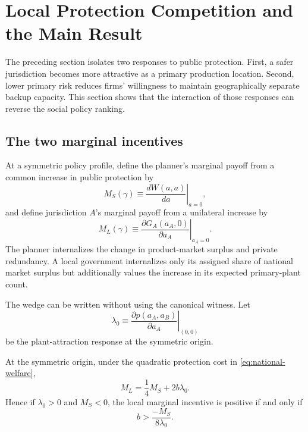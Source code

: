 \section{Local Protection Competition and the Main Result}\label{sec:main}

The preceding section isolates two responses to public protection. First, a safer jurisdiction becomes more attractive as a primary production location. Second, lower primary risk reduces firms' willingness to maintain geographically separate backup capacity. This section shows that the interaction of those responses can reverse the social policy ranking.

\subsection{The two marginal incentives}

At a symmetric policy profile, define the planner's marginal payoff from a common increase in public protection by
\begin{equation}
M_S(\gamma)\equiv \left.\frac{dW(a,a)}{da}\right|_{a=0},
\label{eq:MS}
\end{equation}
and define jurisdiction $A$'s marginal payoff from a unilateral increase by
\begin{equation}
M_L(\gamma)\equiv \left.\frac{\partial G_A(a_A,0)}{\partial a_A}\right|_{a_A=0}.
\label{eq:ML}
\end{equation}
The planner internalizes the change in product-market surplus and private redundancy. A local government internalizes only its assigned share of national market surplus but additionally values the increase in its expected primary-plant count.

The wedge can be written without using the canonical witness. Let
\begin{equation}
\lambda_0\equiv
\left.\frac{\partial p(a_A,a_B)}{\partial a_A}\right|_{(0,0)}
\label{eq:lambda0}
\end{equation}
be the plant-attraction response at the symmetric origin.

\begin{proposition}\label{prop:attraction-threshold}
At the symmetric origin, under the quadratic protection cost in \eqref{eq:national-welfare},
\begin{equation}
M_L=\frac14 M_S+2b\lambda_0.
\label{eq:marginal-decomposition}
\end{equation}
Hence if $\lambda_0>0$ and $M_S<0$, the local marginal incentive is positive if and only if
\begin{equation}
b>\frac{-M_S}{8\lambda_0}.
\label{eq:attraction-threshold}
\end{equation}
\end{proposition}

